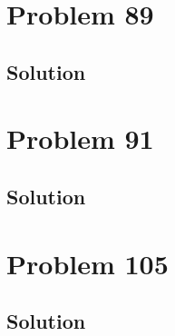 \documentclass[12pt]{article}
\begin{document}
    \section{Problem 89}

        \subsection{Solution}

    \pagebreak
    \section{Problem 91}

        \subsection{Solution}

    \pagebreak
    \section{Problem 105}

        \subsection{Solution}

    \pagebreak
    \tableofcontents
\end{document}
